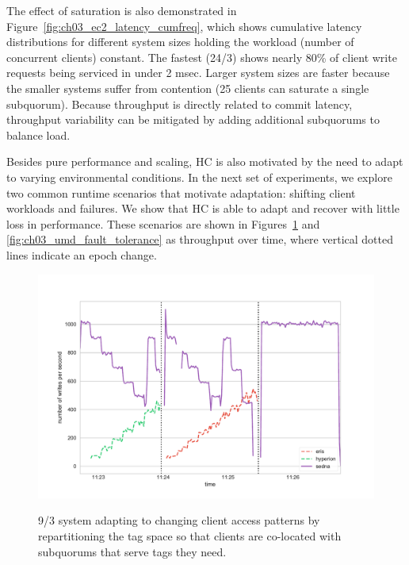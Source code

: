 The effect of saturation is also demonstrated in Figure~\ref{fig:ch03_ec2_latency_cumfreq}, which shows cumulative latency distributions for different system sizes holding the  workload (number of concurrent clients) constant.
The fastest (24/3) shows nearly 80\% of client write requests being serviced in under 2 msec.
Larger system sizes are faster because the smaller systems suffer from contention (25 clients can saturate a single subquorum).
Because throughput is directly related to commit latency, throughput variability can be mitigated by adding additional subquorums to balance load.

Besides pure performance and scaling, HC is also motivated by the need to adapt to varying environmental conditions.
In the next set of experiments, we explore two common runtime scenarios that motivate adaptation: shifting client workloads and failures.
We show that HC is able to adapt and recover with little loss in performance. These scenarios are shown in Figures~\ref{fig:ch03_umd_sawtooth} and \ref{fig:ch03_umd_fault_tolerance} as throughput over time, where vertical dotted lines indicate an epoch change.

\begin{figure}
    \begin{center}
        \includegraphics[width=5in]{figures/ch03_umd_sawtooth.pdf}
    \end{center}
    \renewcommand{\baselinestretch}{1}
    \small\normalsize

    \begin{quote}
        \caption[Sawtooth Graph]{9/3 system adapting to changing client access patterns by repartitioning the tag space so that clients are co-located with subquorums that serve tags they need.}
        \label{fig:ch03_umd_sawtooth}
    \end{quote}
\end{figure}
\renewcommand{\baselinestretch}{2}
\small\normalsize

